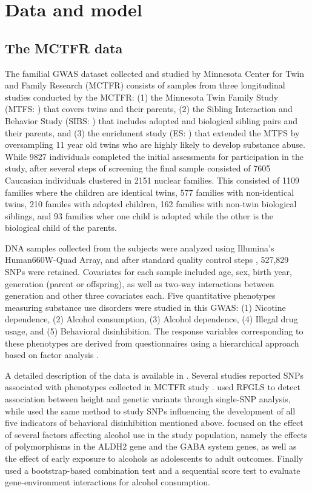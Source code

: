 \section{Data and model}
\label{sec:modelSection}

\subsection{The MCTFR data}
The familial GWAS dataset collected and studied by Minnesota Center for Twin and Family Research (MCTFR)\citep{LiEtal11, MillerEtal12, McGueEtal13} consists of samples from three longitudinal studies conducted by the MCTFR: (1) the Minnesota Twin Family Study (MTFS: \cite{IaconoEtal99}) that covers twins and their parents, (2) the Sibling Interaction and Behavior Study (SIBS: \cite{McGueEtal07}) that includes adopted and biological sibling pairs and their parents, and (3) the enrichment study (ES: \cite{KeyesEtal09}) that extended the MTFS by oversampling 11 year old twins who are highly likely to develop substance abuse. While 9827 individuals completed the initial assessments for participation in the study, after several steps of screening \citep{MillerEtal12} the final sample consisted of 7605 Caucasian individuals clustered in 2151 nuclear families. This consisted of 1109 families where the children are identical twins, 577 families with non-identical twins, 210 familes with adopted children, 162 families with non-twin biological siblings, and 93 families wher one child is adopted while the other is the biological child of the parents.

DNA samples collected from the subjects were analyzed using Illumina's Human660W-Quad Array, and after standard quality control steps \citep{MillerEtal12}, 527,829 SNPs were retained. Covariates for each sample included age, sex, birth year, generation (parent or offspring), as well as two-way interactions between generation and other three covariates each. Five quantitative phenotypes measuring substance use disorders were studied in this GWAS: (1) Nicotine dependence, (2) Alcohol consumption, (3) Alcohol dependence, (4) Illegal drug usage, and (5) Behavioral disinhibition. The response variables corresponding to these phenotypes are derived from questionnaires using a hierarchical approach based on factor analysis \citep{HicksEtal11}.

A detailed description of the data is available  in \cite{MillerEtal12}. Several studies reported SNPs associated with phenotypes collected in MCTFR study \citep{LiEtal11, McGueEtal13, CoombesBasuMcGue17}. \cite{LiEtal11} used RFGLS to detect association between height and genetic variants through single-SNP analysis, while \cite{McGueEtal13} used the same method to study SNPs influencing the development of all five indicators of behavioral disinhibition mentioned above. \cite{IronsThesis12} focused on the effect of several factors affecting alcohol use in the study population, namely the effects of polymorphisms in the ALDH2 gene and the GABA system genes, as well as the effect of early exposure to alcohols as adolescents to adult outcomes. Finally \cite{CoombesBasuMcGue17} used a bootstrap-based combination test and a sequential score test to evaluate gene-environment interactions for alcohol consumption.

